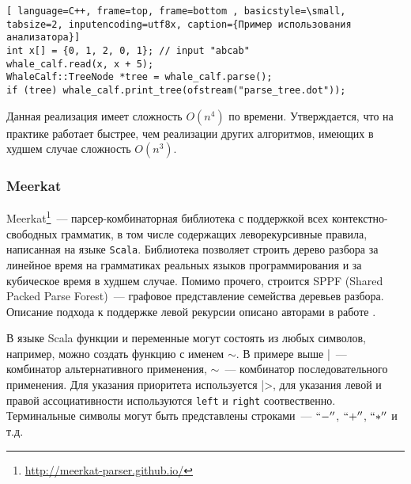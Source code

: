 \begin{lstlisting}[ language=C++, frame=top, frame=bottom , basicstyle=\small, tabsize=2, inputencoding=utf8x, caption={Пример использования анализатора}]
int x[] = {0, 1, 2, 0, 1}; // input "abcab"
whale_calf.read(x, x + 5);
WhaleCalf::TreeNode *tree = whale_calf.parse();
if (tree) whale_calf.print_tree(ofstream("parse_tree.dot"));
\end{lstlisting}

Данная реализация имеет сложность $O(n^{4})$ по времени. Утверждается, что на практике работает быстрее, чем реализации других алгоритмов, имеющих в худшем случае сложность $O(n^{3})$.


\subsubsection{Meerkat}
Meerkat\footnote{\url{http://meerkat-parser.github.io/}}~--- парсер-комбинаторная библиотека с поддержкой всех контекстно-свободных грамматик, в том числе содержащих леворекурсивные правила, написанная на языке {\tt Scala}. Библиотека позволяет строить дерево разбора за линейное время на грамматиках реальных языков программирования и за кубическое время в худшем случае. Помимо прочего, строится SPPF (Shared Packed Parse Forest)~--- графовое представление семейства деревьев разбора. Описание подхода к поддержке левой рекурсии описано авторами в работе \cite{izmaylova2016practical}.

В языке Scala функции и переменные могут состоять из любых символов, например, можно создать функцию с именем $\sim$. В примере выше |~--- комбинатор альтернативного применения, $\sim$~--- комбинатор последовательного применения. Для указания приоритета используется |>, для указания левой и правой ассоциативности используются \lstinline[language=Scala]{left} и \lstinline[language=Scala]{right} соотвественно. Терминальные символы могут быть представлены строками~--- $``-''$, $``+''$, $``*''$ и т.д.

